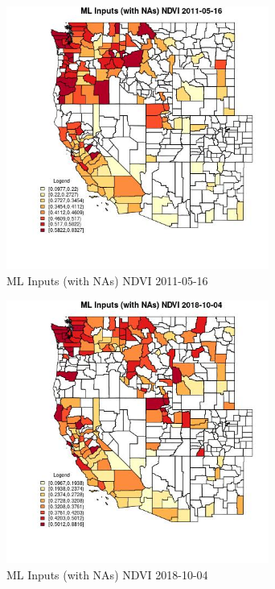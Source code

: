 \begin{figure} 
\centering  
\includegraphics[width=0.77\textwidth]{Code_Outputs/Report_ML_input_PM25_Step4_part_f_de_duplicated_aves_prioritize_24hr_obswNAs_CountyNDVIMean2011-05-16.jpg} 
\caption{\label{fig:Report_ML_input_PM25_Step4_part_f_de_duplicated_aves_prioritize_24hr_obswNAsCountyNDVIMean2011-05-16}ML Inputs (with NAs) NDVI 2011-05-16} 
\end{figure} 
 

\begin{figure} 
\centering  
\includegraphics[width=0.77\textwidth]{Code_Outputs/Report_ML_input_PM25_Step4_part_f_de_duplicated_aves_prioritize_24hr_obswNAs_CountyNDVIMean2018-10-04.jpg} 
\caption{\label{fig:Report_ML_input_PM25_Step4_part_f_de_duplicated_aves_prioritize_24hr_obswNAsCountyNDVIMean2018-10-04}ML Inputs (with NAs) NDVI 2018-10-04} 
\end{figure} 
 

